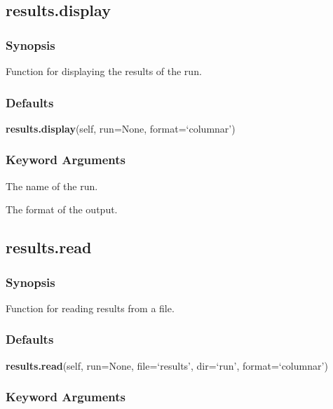   

 \newpage 

 \subsection{results.display} 

  
 \subsubsection{Synopsis} 

 Function for displaying the results of the run. 
  

  
 \subsubsection{Defaults} 

 \textsf{\textbf{results.display}(self, run=None, format=`columnar')} 

  
 \subsubsection{Keyword Arguments} 

   The name of the run.   

   The format of the output.  

  

  

 \newpage 

 \subsection{results.read} 

  
 \subsubsection{Synopsis} 

 Function for reading results from a file. 
  

  
 \subsubsection{Defaults} 

 \textsf{\textbf{results.read}(self, run=None, file=`results', dir=`run', format=`columnar')} 

  
 \subsubsection{Keyword Arguments} 

